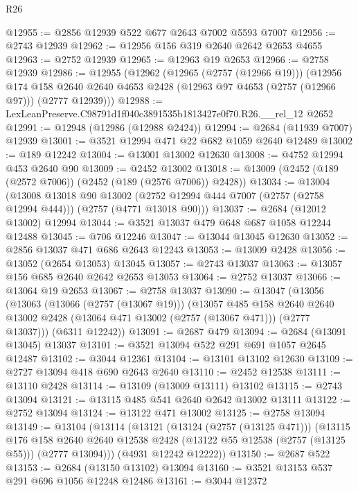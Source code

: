 \begin{lexlean}{R26}
\begin{coremodule}
@12955 := @2856 @12939 @522 @677 @2643 @7002 @5593 @7007
@12956 := @2743 @12939
@12962 := @12956 @156 @319 @2640 @2642 @2653 @4655
@12963 := @2752 @12939
@12965 := @12963 @19 @2653
@12966 := @2758 @12939
@12986 := @12955
    (@12962
      (@12965 (@2757 (@12966 @19)))
      (@12956
        @174
        @158
        @2640
        @2640
        @4653
        @2428
        (@12963 @97 @4653 (@2757 (@12966 @97)))
        (@2777 @12939)))
@12988 := LexLeanPreserve.C98791d1f040c3891535b1813427e0f70.R26.__rel_12 @2652
@12991 := @12948 (@12986 (@12988 @2424))
@12994 := @2684 (@11939 @7007) @12939
@13001 := @3521 @12994 @471 @22 @682 @1059 @2640 @12489
@13002 := @189 @12242
@13004 := @13001 @13002 @12630
@13008 := @4752 @12994 @453 @2640 @90
@13009 := @2452 @13002
@13018 := @13009 (@2452 (@189 (@2572 @7006)) (@2452 (@189 (@2576 @7006)) @2428))
@13034 := @13004
    (@13008
      @13018
      @90
      @13002
      (@2752 @12994 @444 @7007 (@2757 (@2758 @12994 @444)))
      (@2757 (@4771 @13018 @90)))
@13037 := @2684 (@12012 @13002) @12994
@13044 := @3521 @13037 @479 @648 @687 @1058 @12244 @12488
@13045 := @706 @12246
@13047 := @13044 @13045 @12630
@13052 := @2856 @13037 @471 @686 @2643 @12243
@13053 := @13009 @2428
@13056 := @13052 (@2654 @13053) @13045
@13057 := @2743 @13037
@13063 := @13057 @156 @685 @2640 @2642 @2653 @13053
@13064 := @2752 @13037
@13066 := @13064 @19 @2653
@13067 := @2758 @13037
@13090 := @13047
    (@13056
      (@13063
        (@13066 (@2757 (@13067 @19)))
        (@13057
          @485
          @158
          @2640
          @2640
          @13002
          @2428
          (@13064 @471 @13002 (@2757 (@13067 @471)))
          (@2777 @13037)))
      (@6311 @12242))
@13091 := @2687 @479
@13094 := @2684 (@13091 @13045) @13037
@13101 := @3521 @13094 @522 @291 @691 @1057 @2645 @12487
@13102 := @3044 @12361
@13104 := @13101 @13102 @12630
@13109 := @2727 @13094 @418 @690 @2643 @2640
@13110 := @2452 @12538
@13111 := @13110 @2428
@13114 := @13109 (@13009 @13111) @13102
@13115 := @2743 @13094
@13121 := @13115 @485 @541 @2640 @2642 @13002 @13111
@13122 := @2752 @13094
@13124 := @13122 @471 @13002
@13125 := @2758 @13094
@13149 := @13104
    (@13114
      (@13121
        (@13124 (@2757 (@13125 @471)))
        (@13115
          @176
          @158
          @2640
          @2640
          @12538
          @2428
          (@13122 @55 @12538 (@2757 (@13125 @55)))
          (@2777 @13094)))
      (@4931 @12242 @12222))
@13150 := @2687 @522
@13153 := @2684 (@13150 @13102) @13094
@13160 := @3521 @13153 @537 @291 @696 @1056 @12248 @12486
@13161 := @3044 @12372

\end{coremodule}
\end{lexlean}
